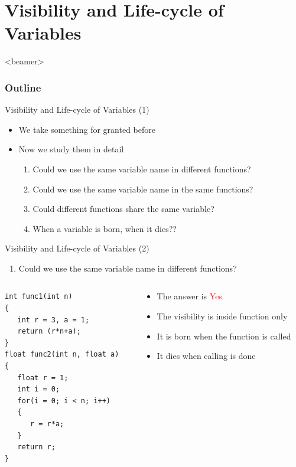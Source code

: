 \section{Visibility and Life-cycle of Variables}
\label{sec:vars}
\begin{frame}<beamer>
    \frametitle{Outline}
    \tableofcontents[currentsection]
\end{frame}

\begin{frame}[fragile]{Visibility and Life-cycle of Variables (1)}
\begin{itemize}
	\item {We take something for granted before}
	\item {Now we study them in detail}
	\begin{enumerate}
		\item {Could we use the same variable name in different functions?}
		\item {Could we use the same variable name in the same functions?}
		\item {Could different functions share the same variable?}
		\item {When a variable is born, when it dies??}
	\end{enumerate}
\end{itemize}

\end{frame}

\begin{frame}[fragile]{Visibility and Life-cycle of Variables (2)}
\begin{enumerate}
	\item {Could we use the same variable name in different functions?}
\end{enumerate}
\begin{columns}
\begin{column}{0.53\linewidth}
\begin{lstlisting}[linewidth=0.9\linewidth, xleftmargin=0.05\linewidth]
int func1(int n)
{
   int r = 3, a = 1;
   return (r*n+a);
}
float func2(int n, float a)
{
   float r = 1;
   int i = 0;
   for(i = 0; i < n; i++)
   {
      r = r*a;
   }
   return r;
}
\end{lstlisting}
\end{column}
\begin{column}{0.46\linewidth}
\begin{itemize}
	\item {The answer is \textcolor{red}{Yes}}
	\item {The visibility is inside function only}
	\item {It is born when the function is called}
	\item {It dies when calling is done}
\end{itemize}
\end{column}
\end{columns}
\end{frame}

